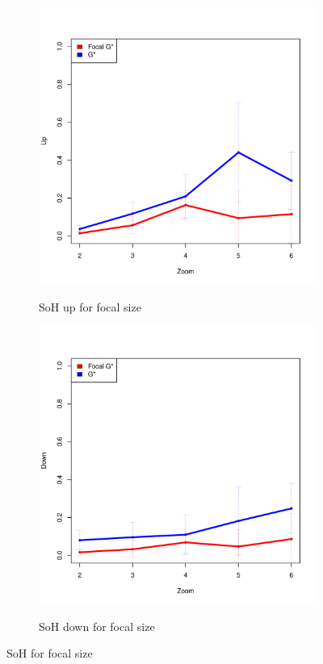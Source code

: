 \documentclass{itatnew}
\begin{document}
\begin{figure}[htp]
  \begin{subfigure}{\linewidth}
    \caption{SoH up for focal size}
    \includegraphics[width=\linewidth]{images/whiskerPlot/zUp}
    \label{fig:zUp}
  \end{subfigure}
  \hspace{1em}
  \begin{subfigure}{\linewidth}
    \caption{SoH down for focal size}
    \includegraphics[width=\linewidth]{images/whiskerPlot/zDown}
    \label{fig:zDown}
  \end{subfigure}
  \caption{SoH for focal size}
  \label{fig:SoHZoom}
\end{figure}
\end{document}
